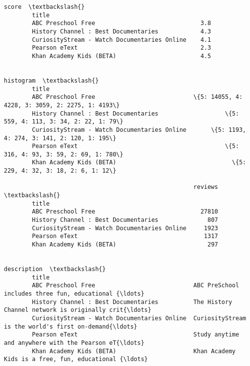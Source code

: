 \documentclass[11pt]{article}
\begin{document}
\begin{Verbatim}[commandchars=\\\{\}]
                                                      score  \textbackslash{}
        title                                                 
        ABC Preschool Free                              3.8   
        History Channel : Best Documentaries            4.3   
        CuriosityStream - Watch Documentaries Online    4.1   
        Pearson eText                                   2.3   
        Khan Academy Kids (BETA)                        4.5   
        
                                                                                           histogram  \textbackslash{}
        title                                                                                          
        ABC Preschool Free                            \{5: 14055, 4: 4228, 3: 3059, 2: 2275, 1: 4193\}   
        History Channel : Best Documentaries                   \{5: 559, 4: 113, 3: 34, 2: 22, 1: 79\}   
        CuriosityStream - Watch Documentaries Online       \{5: 1193, 4: 274, 3: 141, 2: 120, 1: 195\}   
        Pearson eText                                          \{5: 316, 4: 93, 3: 59, 2: 69, 1: 780\}   
        Khan Academy Kids (BETA)                                 \{5: 229, 4: 32, 3: 18, 2: 6, 1: 12\}   
        
                                                      reviews  \textbackslash{}
        title                                                   
        ABC Preschool Free                              27810   
        History Channel : Best Documentaries              807   
        CuriosityStream - Watch Documentaries Online     1923   
        Pearson eText                                    1317   
        Khan Academy Kids (BETA)                          297   
        
                                                                                            description  \textbackslash{}
        title                                                                                             
        ABC Preschool Free                            ABC PreSchool includes three fun, educational {\ldots}   
        History Channel : Best Documentaries          The History Channel network is originally crit{\ldots}   
        CuriosityStream - Watch Documentaries Online  CuriosityStream is the world's first on-demand{\ldots}   
        Pearson eText                                 Study anytime and anywhere with the Pearson eT{\ldots}   
        Khan Academy Kids (BETA)                      Khan Academy Kids is a free, fun, educational {\ldots}   
        

\end{Verbatim}
\end{document}
